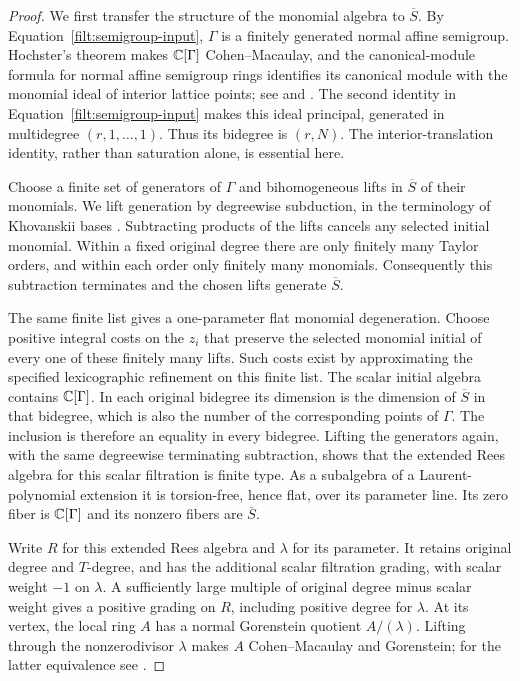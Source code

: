 \begin{proof}
We first transfer the structure of the monomial algebra to
$\overline S$.  By Equation~\eqref{filt:semigroup-input}, $\Gamma$ is a
finitely generated normal affine semigroup.  Hochster's theorem makes
$\mathbb C[\Gamma]$
Cohen--Macaulay, and the canonical-module formula for normal affine
semigroup rings identifies its canonical module with the monomial ideal
of interior lattice points; see \cite{Hochster72} and
\cite[Theorem~6.7 and its following normal-monoid reformulation]{Stanley78}.
The second identity in Equation~\eqref{filt:semigroup-input} makes this
ideal principal, generated in multidegree $(r,1,\ldots,1)$.  Thus its
bidegree is $(r,N)$.  The interior-translation identity, rather than
saturation alone, is essential here.

Choose a finite set of generators of $\Gamma$ and bihomogeneous lifts in
$\overline S$ of their monomials.  We lift generation by degreewise
subduction, in the terminology of Khovanskii bases
\cite[Algorithm~2.11 and Proposition~2.13]{KavehManon2019}.
Subtracting products of the lifts cancels any selected initial monomial.
Within a fixed original degree there are only finitely many Taylor
orders, and within each order only
finitely many monomials.  Consequently this subtraction terminates and
the chosen lifts generate $\overline S$.

The same finite list gives a one-parameter flat monomial degeneration.
Choose positive integral costs on the $z_i$ that preserve the selected
monomial initial of every one of these
finitely many lifts.  Such costs exist by approximating the specified
lexicographic refinement on this finite list.  The scalar initial
algebra contains $\mathbb C[\Gamma]$.  In each original bidegree its dimension
is the dimension of $\overline S$ in that bidegree, which is also the
number of the corresponding points of $\Gamma$.  The inclusion is
therefore an equality in every bidegree.  Lifting the generators again,
with the same degreewise terminating subtraction, shows that the
extended Rees algebra for this scalar filtration is finite type.  As a
subalgebra of a Laurent-polynomial extension it is torsion-free, hence
flat, over its parameter line.  Its zero fiber is $\mathbb C[\Gamma]$ and its
nonzero fibers are $\overline S$.

Write $R$ for this extended Rees algebra and $\lambda$ for its parameter.
It retains original degree and $T$-degree, and has the additional scalar
filtration grading, with scalar weight $-1$ on $\lambda$.
A sufficiently large multiple of original degree minus scalar weight
gives a positive grading on $R$, including positive degree for $\lambda$.
At its vertex, the local ring $A$ has a normal Gorenstein quotient
$A/(\lambda)$.
Lifting through the nonzerodivisor $\lambda$ makes $A$
Cohen--Macaulay and Gorenstein; for the latter equivalence see
\cite[Tag~0BJJ]{StacksProject}.


\end{proof}

